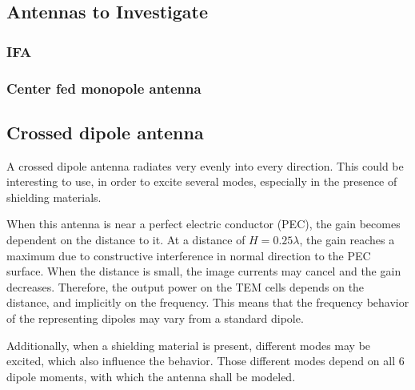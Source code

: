 \subsection{Antennas to Investigate}


\subsubsection{IFA}
\subsubsection{Center fed monopole antenna}
\subsection{Crossed dipole antenna}

A crossed dipole antenna radiates very evenly into every direction. This could be interesting to use, in order to excite several modes, especially in the presence of shielding materials.

When this antenna is near a perfect electric conductor (PEC), the gain becomes dependent on the distance to it. At a distance of $H=0.25\lambda$, the gain reaches a maximum due to constructive interference in normal direction to the PEC surface. When the distance is small, the image currents may cancel and the gain decreases. Therefore, the output power on the TEM cells depends on the distance, and implicitly on the frequency. This means that the frequency behavior of the representing dipoles may vary from a standard dipole.

Additionally, when a shielding material is present, different modes may be excited, which also influence the behavior. Those different modes depend on all 6 dipole moments, with which the antenna shall be modeled. 
